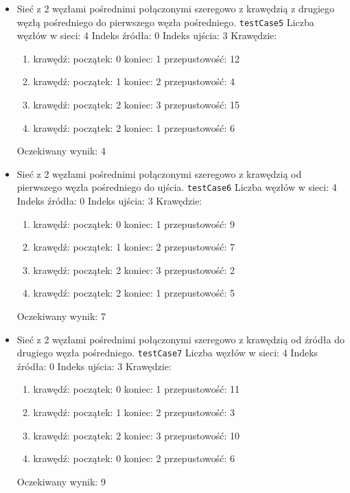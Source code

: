 \begin{itemize}[nosep]
    \item Sieć z 2 węzłami pośrednimi połączonymi szeregowo z krawędzią z
    drugiego węzłą pośredniego do pierwszego węzła pośredniego.
    \texttt{testCase5}
    Liczba węzłów w sieci: 4
    Indeks źródła: 0
    Indeks ujścia: 3
    Krawędzie:
    \begin{enumerate}[nosep]
        \item krawędź:
        początek: 0
        koniec: 1
        przepustowość: 12
        \item krawędź:
        początek: 1
        koniec: 2
        przepustowość: 4
        \item krawędź:
        początek: 2
        koniec: 3
        przepustowość: 15
        \item krawędź:
        początek: 2
        koniec: 1
        przepustowość: 6
    \end{enumerate}
    Oczekiwany wynik: 4

    \item Sieć z 2 węzłami pośrednimi połączonymi szeregowo z krawędzią od
    pierwszego węzła pośredniego do ujścia.
    \texttt{testCase6}
    Liczba węzłów w sieci: 4
    Indeks źródła: 0
    Indeks ujścia: 3
    Krawędzie:
    \begin{enumerate}[nosep]
        \item krawędź:
        początek: 0
        koniec: 1
        przepustowość: 9
        \item krawędź:
        początek: 1
        koniec: 2
        przepustowość: 7
        \item krawędź:
        początek: 2
        koniec: 3
        przepustowość: 2
        \item krawędź:
        początek: 2
        koniec: 1
        przepustowość: 5
    \end{enumerate}
    Oczekiwany wynik: 7

    \item Sieć z 2 węzłami pośrednimi połączonymi szeregowo z krawędzią od
    źródła do drugiego węzła pośredniego.
    \texttt{testCase7}
    Liczba węzłów w sieci: 4
    Indeks źródła: 0
    Indeks ujścia: 3
    Krawędzie:
    \begin{enumerate}[nosep]
        \item krawędź:
        początek: 0
        koniec: 1
        przepustowość: 11
        \item krawędź:
        początek: 1
        koniec: 2
        przepustowość: 3
        \item krawędź:
        początek: 2
        koniec: 3
        przepustowość: 10
        \item krawędź:
        początek: 0
        koniec: 2
        przepustowość: 6
    \end{enumerate}
    Oczekiwany wynik: 9

\end{itemize}


